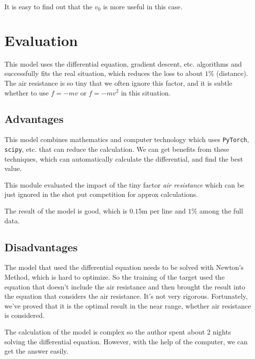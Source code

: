 \documentclass{article}
\begin{document}
It is easy to find out that the $v_0$ is more useful in this case.

\section{Evaluation}

\label{section:evaluation}

This model uses the differential equation, gradient descent, etc. algorithms and successfully fits the real situation, which reduces the loss to about $1\%$ (distance). The air resistance is so tiny that we often ignore this factor, and it is subtle whether to use $f=-mv$ or $f=-mv^2$ in this situation.

\subsection{Advantages}

\label{subsection:advantages}

This model combines mathematics and computer technology which uses \texttt{PyTorch}, \texttt{scipy}, etc. that can reduce the calculation. We can get benefits from these techniques, which can automatically calculate the differential, and find the best value.

This module evaluated the impact of the tiny factor \textit{air resistance} which can be just ignored in the shot put competition for approx calculations.

The result of the model is good, which is $0.15\si{\meter}$ per line and $1\%$ among the full data.

\subsection{Disadvantages}

\label{subsection:disadvantages}

The model that used the differential equation needs to be solved with Newton's Method, which is hard to optimize. So the training of the target used the equation that doesn't include the air resistance and then brought the result into the equation that considers the air resistance. It's not very rigorous. Fortunately, we've proved that it is the optimal result in the near range, whether air resistance is considered.

The calculation of the model is complex so the author spent about 2 nights solving the differential equation. However, with the help of the computer, we can get the answer easily.
\end{document}
